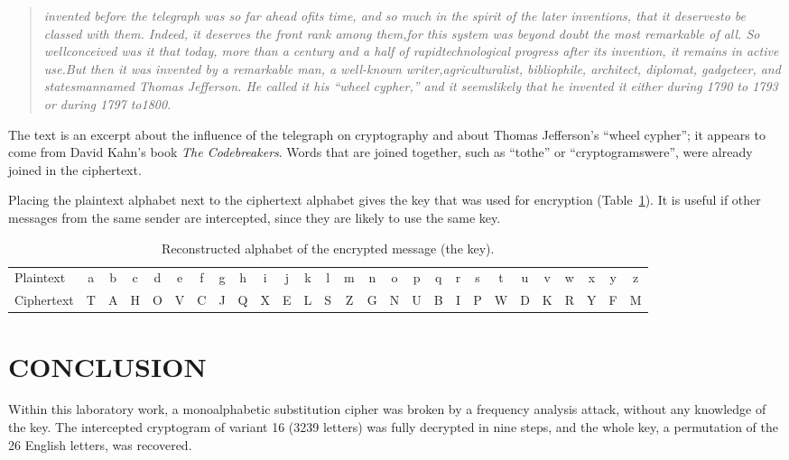 \documentclass[12pt,a4paper]{article}
\newenvironment{cryptotext}{\begin{quote}\raggedright\itshape\small}{\end{quote}}
\begin{document}
\begin{cryptotext}
invented before the telegraph was so far ahead ofits time, and so much in the spirit of the later inventions, that it deservesto be classed with them. Indeed, it deserves the front rank among them,for this system was beyond doubt the most remarkable of all. So wellconceived was it that today, more than a century and a half of rapidtechnological progress after its invention, it remains in active use.But then it was invented by a remarkable man, a well-known writer,agriculturalist, bibliophile, architect, diplomat, gadgeteer, and statesmannamed Thomas Jefferson. He called it his ``wheel cypher,'' and it seemslikely that he invented it either during 1790 to 1793 or during 1797 to1800.
\end{cryptotext}

The text is an excerpt about the influence of the telegraph on cryptography and about
Thomas Jefferson's ``wheel cypher''; it appears to come from David Kahn's book
\textit{The Codebreakers}. Words that are joined together, such as ``tothe'' or
``cryptogramswere'', were already joined in the ciphertext.

Placing the plaintext alphabet next to the ciphertext alphabet gives the key that was used
for encryption (Table~\ref{tab:key}). It is useful if other messages from the same sender
are intercepted, since they are likely to use the same key.

\begin{table}[H]
  \centering
  \caption{Reconstructed alphabet of the encrypted message (the key).}
  \label{tab:key}
  \setlength{\tabcolsep}{2.6pt}
  \small
  \begin{tabular}{l*{26}{c}}
    \toprule
    Plaintext & a & b & c & d & e & f & g & h & i & j & k & l & m & n & o & p & q & r & s & t & u & v & w & x & y & z \\
    Ciphertext & T & A & H & O & V & C & J & Q & X & E & L & S & Z & G & N & U & B & I & P & W & D & K & R & Y & F & M \\
    \bottomrule
  \end{tabular}
\end{table}

\section{CONCLUSION}

Within this laboratory work, a monoalphabetic substitution cipher was broken by a frequency
analysis attack, without any knowledge of the key. The intercepted cryptogram of variant 16
(3239 letters) was fully decrypted in nine steps, and the whole key, a permutation of the 26
English letters, was recovered.
\end{document}

